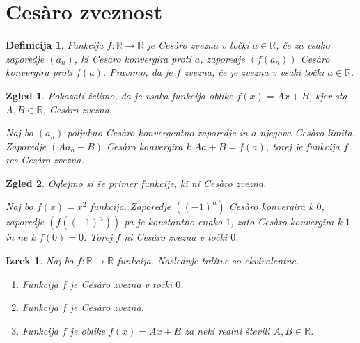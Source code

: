 \documentclass[10]{beamer}
\newtheorem{izrek}{Izrek}
\newtheorem{definicija}{Definicija}
\newtheorem{zgled}{Zgled}
\begin{document}
\section{Ces\`{a}ro zveznost}

\begin{frame}
    \begin{definicija}
        Funkcija $f: \mathbb{R} \rightarrow \mathbb{R}$ je Ces\`{a}ro zvezna v točki $a \in \mathbb{R}$, če za vsako zaporedje $(a_n)$, ki Ces\`{a}ro konvergira proti $a$, zaporedje $(f(a_n))$ Ces\`{a}ro konvergira proti $f(a)$. Pravimo, da je $f$ zvezna, če je zvezna v vsaki točki $a \in \mathbb{R}$.
    \end{definicija}
\end{frame}

\begin{frame}
    \begin{zgled}
        Pokazati želimo, da je vsaka funkcija oblike $f(x) = Ax + B$, kjer sta $A, B \in \mathbb{R}$, Ces\`{a}ro zvezna. 
        \pause

        Naj bo $(a_n)$ poljubno Ces\`{a}ro konvergentno zaporedje in $a$ njegova Ces\`{a}ro limita. Zaporedje $(A a_n + B)$ Ces\`{a}ro konvergira k $A a + B = f(a)$, torej je funkcija $f$ res Ces\`{a}ro zvezna.
    \end{zgled}
    \pause
    \begin{zgled}
        Oglejmo si še primer funkcije, ki ni Ces\`{a}ro zvezna. 
        \pause

        Naj bo $f(x) = x^2$ funkcija. Zaporedje $((-1)^n)$ Ces\`{a}ro konvergira k $0$, zaporedje $(f((-1)^n))$ pa je konstantno enako $1$, zato Ces\`{a}ro konvergira k $1$ in ne k $f(0) = 0$. Torej $f$ ni Ces\`{a}ro zvezna v točki $0$.
    \end{zgled}
\end{frame}

\begin{frame}
    \begin{izrek}
        \label{klaszvez}
        Naj bo $f: \mathbb{R} \rightarrow \mathbb{R}$ funkcija. Naslednje trditve so ekvivalentne.
        \begin{enumerate}
            \item Funkcija $f$ je Ces\`{a}ro zvezna v točki $0$.
            \item Funkcija $f$ je Ces\`{a}ro zvezna.
            \item Funkcija $f$ je oblike $f(x) = Ax + B$ za neki realni števili $A, B \in \mathbb{R}$.
        \end{enumerate}
    \end{izrek}
\end{frame}
\end{document}
